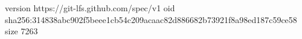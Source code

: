 version https://git-lfs.github.com/spec/v1
oid sha256:314838abc902f5beee1cb54c209acaac82d886682b73921f8a98ed187c59ce58
size 7263
